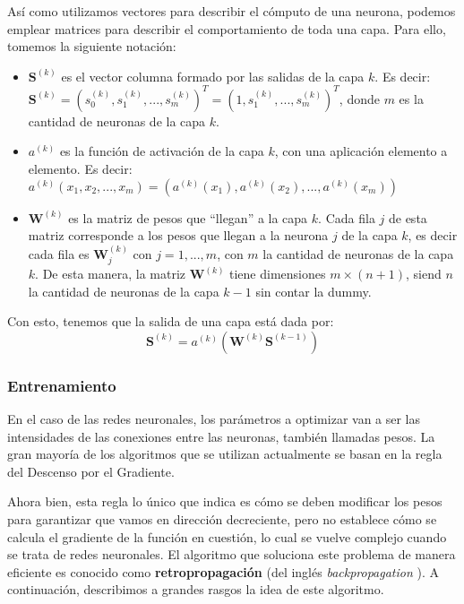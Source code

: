 \documentclass[../../main.tex]{subfiles}
\begin{document}
Así como utilizamos vectores para describir el cómputo de una neurona, podemos emplear
matrices para describir el comportamiento de toda una capa. Para ello, tomemos la siguiente
notación:
\begin{itemize}[itemsep=0.1cm]
    \item \(\mathbf{S}^{(k)}\) es el vector columna formado por las salidas de la capa
    \(k\). Es decir: \(\mathbf{S}^{(k)} = (s_0^{(k)}, s_1^{(k)}, ..., s_m^{(k)})^T = (1,
    s_1^{(k)}, ..., s_m^{(k)})^T\), donde \(m\) es la cantidad de neuronas de la capa
    \(k\).
    \item \(a^{(k)}\) es la función de activación de la capa \(k\), con una aplicación
    elemento a elemento. Es decir: \(a^{(k)}(x_1, x_2, ..., x_m) = (a^{(k)}(x_1),
    a^{(k)}(x_2), ..., a^{(k)}(x_m))\)
    \item \(\mathbf{W}^{(k)}\) es la matriz de pesos que ``llegan'' a la capa \(k\). Cada
    fila \(j\) de esta matriz corresponde a los pesos que llegan a la neurona \(j\) de la
    capa \(k\), es decir cada fila es \(\mathbf{W}^{(k)}_j\) con \(j = 1,...,m\), con
    \(m\) la cantidad de neuronas de la capa \(k\). De esta manera, la matriz \(\mathbf{W}^{(k)}\)
    tiene dimensiones \(m \times (n + 1)\), siend \(n\) la cantidad de neuronas de la capa
    \(k-1\) sin contar la dummy.
\end{itemize}
Con esto, tenemos que la salida de una capa está dada por:
\[
    \mathbf{S}^{(k)} = a^{(k)} \left( \mathbf{W}^{(k)} \mathbf{S}^{(k-1)} \right)
\]


\subsubsection{Entrenamiento}
En el caso de las redes neuronales, los parámetros a optimizar van a ser las intensidades
de las conexiones entre las neuronas, también llamadas pesos. La gran mayoría de los
algoritmos que se utilizan actualmente se basan en la regla del Descenso por el Gradiente.

Ahora bien, esta regla lo único que indica es cómo se deben modificar los pesos para
garantizar que vamos en dirección decreciente, pero no establece cómo se calcula el
gradiente de la función en cuestión, lo cual se vuelve complejo cuando se trata de redes
neuronales. El algoritmo que soluciona este problema de manera eficiente es conocido como
\textbf{retropropagación} (del inglés \textit{backpropagation} \cite{backprop-1986}). A
continuación, describimos a grandes rasgos la idea de este algoritmo.
\end{document}
